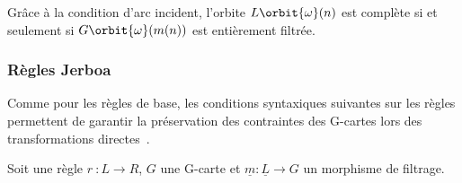 \begin{remarque}
	Grâce à la condition d'arc incident, l'orbite $L\orbit{\omega}(n)$ est complète si et seulement si $G\orbit{\omega}(m(n))$ est entièrement filtrée. %
\end{remarque}

\subsubsection[Règles Jerboa]{Règles Jerboa}
\label{sec:etat-art-model-regles-regles-jerboa}

Comme pour les règles de base, les conditions syntaxiques suivantes sur les règles permettent de garantir la préservation des contraintes des G-cartes lors des transformations directes~\cite{pascual2022topological}.

\begin{theoreme}\label{thm:preservation-coherence-topo-regles}%
	Soit une règle $r~: L \longrightarrow R$, $G$ une G-carte et $\underline{m} : \underline{L} \rightarrow G$ un morphisme de filtrage.


\end{theoreme}
